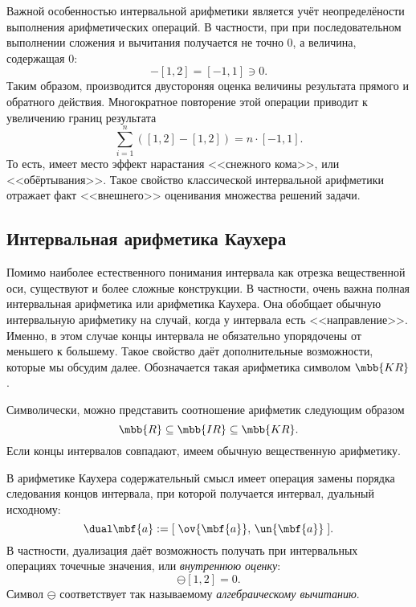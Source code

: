 \documentclass[a5paper,openany]{book}
\begin{document}
Важной особенностью интервальной арифметики является учёт неопределёности выполнения арифметических операций. В частности, при при последовательном выполнении сложения и вычитания получается не точно 0, а величина, содержащая 0:
\begin{equation*} 
	[1,2]-[1,2] = [-1,1] \ni 0.
\end{equation*}
Таким образом, производится двустороняя оценка величины результата прямого и обратного действия. Многократное повторение этой операции приводит к увеличению границ результата
\begin{equation*} 
	\sum_{i=1}^{n} \left(  [1,2]-[1,2] \right) = n \cdot [-1,1].
\end{equation*}
То есть, имеет место эффект нарастания <<снежного кома>>, или <<обёртывания>>. Такое свойство классической интервальной арифметики отражает факт <<внешнего>> оценивания множества решений задачи.  

\subsection{Интервальная арифметика Каухера}

Помимо наиболее естественного понимания интервала как отрезка вещественной оси, существуют и более сложные конструкции. В частности, очень важна полная интервальная арифметика или арифметика Каухера. Она обобщает обычную интервальную арифметику на случай, когда у интервала есть <<направление>>. Именно, в этом случае концы интервала не обязательно упорядочены от меньшего к большему. Такое свойство даёт дополнительные возможности, которые мы обсудим далее. Обозначается такая арифметика символом $\mbb{KR}$. 

Символически, можно представить соотношение арифметик следующим образом
$$ \mbb{R} \subseteq \mbb{IR} \subseteq \mbb{KR}. $$
Если концы интервалов совпадают, имеем обычную вещественную арифметику.

В арифметике Каухера содержательный смысл имеет операция замены порядка следования концов интервала, при которой получается интервал, дуальный исходному: 
\begin{equation*}
	\label{Dualization}
	\dual\mbf{a} := [\;\ov{\mbf{a}},\,\un{\mbf{a}}\;].
\end{equation*}
В частности, дуализация даёт возможность получать при интервальных операциях точечные значения, или \emph{внутреннюю оценку}:
\begin{equation*}
	[1,2] \ominus [1,2]=0.
\end{equation*}
Символ $\ominus$ соответствует так называемому \emph{алгебраическому вычитанию}.  
\end{document}
